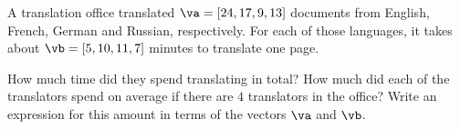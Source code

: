 

\begin{problem}%
    A translation office translated $\va=[24, 17, 9, 13]$ documents from English, French, German and Russian, respectively. For each of those languages, it takes about $\vb=[5, 10, 11, 7]$ minutes to translate one page.

\smallskip
    
    How much time did they spend translating in total? How much did each of the translators spend on average if there are $4$ translators in the office? Write an expression for this amount in terms of the vectors $\va$ and $\vb$.
\end{problem}



